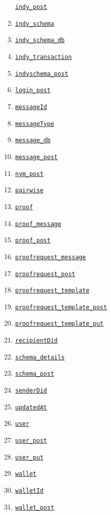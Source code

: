 \begin{enumerate}
  \protect\hyperlink{indy_post}{\texttt{indy\_post}}
\item
  \protect\hyperlink{indy_schema}{\texttt{indy\_schema}}
\item
  \protect\hyperlink{indy_schema_db}{\texttt{indy\_schema\_db}}
\item
  \protect\hyperlink{indy_transaction}{\texttt{indy\_transaction}}
\item
  \protect\hyperlink{indyschema_post}{\texttt{indyschema\_post}}
\item
  \protect\hyperlink{login_post}{\texttt{login\_post}}
\item
  \protect\hyperlink{messageId}{\texttt{messageId}}
\item
  \protect\hyperlink{messageType}{\texttt{messageType}}
\item
  \protect\hyperlink{message_db}{\texttt{message\_db}}
\item
  \protect\hyperlink{message_post}{\texttt{message\_post}}
\item
  \protect\hyperlink{nym_post}{\texttt{nym\_post}}
\item
  \protect\hyperlink{pairwise}{\texttt{pairwise}}
\item
  \protect\hyperlink{proof}{\texttt{proof}}
\item
  \protect\hyperlink{proof_message}{\texttt{proof\_message}}
\item
  \protect\hyperlink{proof_post}{\texttt{proof\_post}}
\item
  \protect\hyperlink{proofrequest_message}{\texttt{proofrequest\_message}}
\item
  \protect\hyperlink{proofrequest_post}{\texttt{proofrequest\_post}}
\item
  \protect\hyperlink{proofrequest_template}{\texttt{proofrequest\_template}}
\item
  \protect\hyperlink{proofrequest_template_post}{\texttt{proofrequest\_template\_post}}
\item
  \protect\hyperlink{proofrequest_template_put}{\texttt{proofrequest\_template\_put}}
\item
  \protect\hyperlink{recipientDid}{\texttt{recipientDid}}
\item
  \protect\hyperlink{schema_details}{\texttt{schema\_details}}
\item
  \protect\hyperlink{schema_post}{\texttt{schema\_post}}
\item
  \protect\hyperlink{senderDid}{\texttt{senderDid}}
\item
  \protect\hyperlink{updatedAt}{\texttt{updatedAt}}
\item
  \protect\hyperlink{user}{\texttt{user}}
\item
  \protect\hyperlink{user_post}{\texttt{user\_post}}
\item
  \protect\hyperlink{user_put}{\texttt{user\_put}}
\item
  \protect\hyperlink{wallet}{\texttt{wallet}}
\item
  \protect\hyperlink{walletId}{\texttt{walletId}}
\item
  \protect\hyperlink{wallet_post}{\texttt{wallet\_post}}
\end{enumerate}


